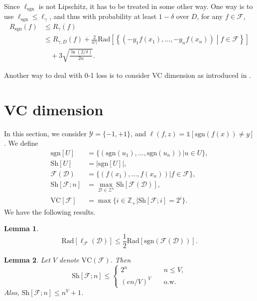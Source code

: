 \documentclass[openany]{book}
\newtheorem{lemma}{Lemma}[chapter]
\theoremstyle{definition}
\theoremstyle{remark}
\begin{document}
Since $\ell_{\mathrm{sgn}}$ is not Lipschitz, it has to be treated in some other way. One way is to use $\ell_{\mathrm{sgn}}\le\ell_{\gamma}$, and thus with probability at least $1-\delta$ over $D$, for any $f\in \mathcal{F}$,
\begin{align*}
    R_{\mathrm{sgn}}(f) & \le R_{\gamma}(f) \\
     & \le R_{\gamma,D}(f)+\frac{2}{n\gamma}\mathrm{Rad}\left[\left\{(-y_1f(x_1),\ldots,-y_nf(x_n))\middle|f\in \mathcal{F}\right\}\right] \\
     & \quad+3\sqrt{\frac{\ln(2/\delta)}{2n}}.
\end{align*}

Another way to deal with 0-1 loss is to consider VC dimension as introduced in .

\section{VC dimension}\label{sec:VCDim}
In this section, we consider $\mathcal{Y}=\{-1,+1\}$, and $\ell(f,z)=\mathds{1}[\mathrm{sgn}(f(x))\ne y]$. We define
\begin{align*}
    \mathrm{sgn}[U] & =\{(\mathrm{sgn}(u_1),\ldots,\mathrm{sgn}(u_n))|u\in U\}, \\
    \mathrm{Sh}[U] & =|\mathrm{sgn}[U]|, \\
    \mathcal{F}(\mathcal{D}) & =\{(f(x_1),\ldots,f(x_n))|f\in \mathcal{F}\}, \\
    \mathrm{Sh}[\mathcal{F};n] & =\max_{\mathcal{D}\in \mathcal{Z}^n}\mathrm{Sh}[\mathcal{F}(\mathcal{D})], \\
    \mathrm{VC}[\mathcal{F}] & =\max\{i\in \mathbb{Z}_+|\mathrm{Sh}[\mathcal{F};i]=2^i\}.
\end{align*}
We have the following results.
\begin{lemma}
    \begin{equation*}
        \mathrm{Rad}[\ell_{\mathcal{F}}(\mathcal{D})]\le \frac{1}{2}\mathrm{Rad}[\mathrm{sgn}(\mathcal{F}(\mathcal{D}))].
    \end{equation*}
\end{lemma}
\begin{lemma}
    Let $V$ denote $\mathrm{VC}(\mathcal{F})$. Then
    \begin{equation*}
        \mathrm{Sh}[\mathcal{F};n]\le\left\{
        \begin{array}{ll}
            2^n & \quad n\le V, \\
            (en/V)^V & \quad\textrm{o.w.}
        \end{array}
        \right.
    \end{equation*}
    Also, $\mathrm{Sh}[\mathcal{F};n]\le n^V+1$.
\end{lemma}
\end{document}
